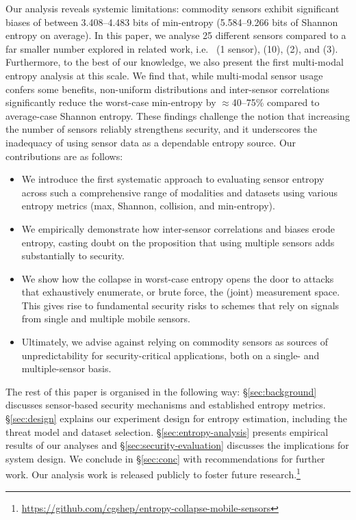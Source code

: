 Our analysis reveals systemic limitations: commodity sensors exhibit significant biases of between 3.408--4.483 bits of min-entropy (5.584--9.266 bits of Shannon entropy on average). In this paper, we analyse 25 different sensors compared to a far smaller number explored in related work, i.e.\ \cite{voris2011accelerometers} (1 sensor), \cite{hennebert2013entropy} (10), \cite{krhovjak2007sources} (2), and \cite{lv2020analysis} (3). Furthermore, to the best of our knowledge, we also present the first multi-modal entropy analysis at this scale. We find that, while multi-modal sensor usage confers some benefits, non-uniform distributions and inter-sensor correlations significantly reduce the worst-case min-entropy by $\approx$40--75\% compared to average-case Shannon entropy. These findings challenge the notion that increasing the number of sensors reliably strengthens security, and it underscores the inadequacy of using sensor data as a dependable entropy source. Our contributions are as follows:
\begin{itemize} 
\item We introduce the first systematic approach to evaluating sensor entropy across such a comprehensive range of modalities and datasets using various entropy metrics (max, Shannon, collision, and min-entropy).
\item We empirically demonstrate how inter-sensor correlations and biases erode entropy, casting doubt on the proposition that using multiple sensors adds substantially to security. 
\item We show how the collapse in worst-case entropy opens the door to attacks that exhaustively enumerate, or brute force, the (joint) measurement space. This gives rise to fundamental security risks to schemes that rely on signals from single and multiple mobile sensors.
\item Ultimately, we advise against relying on commodity sensors as sources of unpredictability for security-critical applications, both on a single- and multiple-sensor basis.
\end{itemize}

The rest of this paper is organised in the following way: \S\ref{sec:background} discusses sensor-based security mechanisms and established entropy metrics. \S\ref{sec:design} explains our experiment design for entropy estimation, including the threat model and dataset selection. \S\ref{sec:entropy-analysis} presents empirical results of our analyses and \S\ref{sec:security-evaluation} discusses the implications for system design. We conclude in \S\ref{sec:conc} with recommendations for further work. Our analysis work is released publicly to foster future research.\footnote{\url{https://github.com/cgshep/entropy-collapse-mobile-sensors}}
